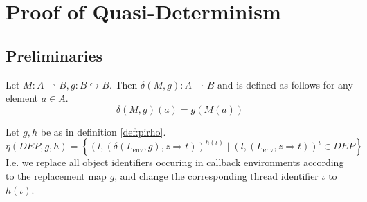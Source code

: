 \chapter{Proof of Quasi-Determinism}
\label{cha:proof_of_qd}

\section{Preliminaries}
\label{sec:preliminaries}

\begin{definition}
  Let $M: A \rightharpoonup B, g: B \hookrightarrow B$. Then $\delta(M, g): A
  \rightharpoonup B$ and is defined as follows for any element $a \in A$.
  \begin{equation*}
    \delta(M, g)(a) = g(M(a))
  \end{equation*}
\end{definition}

\begin{definition}
  Let $g, h$ be as in definition \ref{def:pirho}. 
  \begin{equation*}
    \eta(DEP, g, h) = \left\{ (l, (\delta(L_{\text{env}}, g), z \Rightarrow
    t))^{h(\iota)} \mid (l,
    (L_{\text{env}}, z \Rightarrow t))^\iota \in DEP \right\}
  \end{equation*}
  I.e. we replace all object identifiers occuring in callback environments
  according to the replacement map $g$, and change the corresponding thread
  identifier $\iota$ to $h(\iota)$.
\end{definition}

